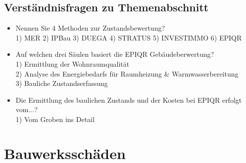 \documentclass[fleqn,twoside,dvipsnames]{article}
\begin{document}
    \subsection{Verständnisfragen zu Themenabschnitt}
        \begin{itemize}
            \item Nennen Sie 4 Methoden zur Zustandsbewertung?\\
            1) MER 2) IPBau 3) DUEGA 4) STRATUS 5) INVESTIMMO 6) EPIQR
            \item Auf welchen drei Säulen basiert die EPIQR Gebäudeberwertung?\\
            1) Ermittlung der Wohnraumqualität\\
            2) Analyse des Energiebedarfs für Raumheizung \& Warmwasserbereitung\\
            3) Bauliche Zustandserfassung
            \item Die Ermittlung des baulichen Zustands und der Kosten bei EPIQR erfolgt vom...?\\
            1) Vom Groben ins Detail
        \end{itemize}

\newpage
    
\section{Bauwerksschäden}
\end{document}
